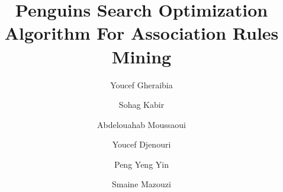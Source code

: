 \documentclass[preprint,12pt]{elsarticle}
\begin{document}
\begin{frontmatter}



\title{Penguins Search Optimization Algorithm For Association Rules Mining}


\author[a,b]{Youcef Gheraibia}
\author[a]{Sohag Kabir}
\author[c]{Abdelouahab Moussaoui}
\author[d]{Youcef Djenouri}
\author[e]{Peng Yeng Yin}
\author[b]{Smaine Mazouzi}

\address[b]{Department of Computer Science, University of Hull, Hull HU6 7RX, UK}

\address[a]{ Badji Mokhtar-Annaba University, P.O. Box 12, 23000 Annaba, Algeria}

\address[c]{Laboratoire de Recherche en Informatique Appliquée (LRIA), Computer Science Department, University of Sétif, 19000, Algeria}

\address[d]{DTISI, CERIST Research Center, Algiers, Algeria}

\address[e]{Department of Information Management, National Chi Nan University, Taiwan}


\begin{abstract}


\end{abstract}
\end{frontmatter}
\end{document}
